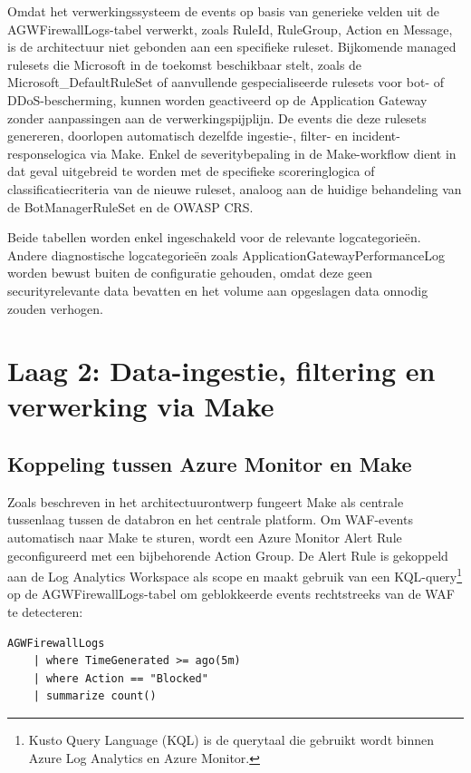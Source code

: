 Omdat het verwerkingssysteem de events op basis van generieke velden uit de AGWFirewallLogs-tabel verwerkt, zoals RuleId, RuleGroup, Action en Message, is de architectuur niet gebonden aan een specifieke ruleset. Bijkomende managed rulesets die Microsoft in de toekomst beschikbaar stelt, zoals de Microsoft\_DefaultRuleSet of aanvullende gespecialiseerde rulesets voor bot- of DDoS-bescherming, kunnen worden geactiveerd op de Application Gateway zonder aanpassingen aan de verwerkingspijplijn. De events die deze rulesets genereren, doorlopen automatisch dezelfde ingestie-, filter- en incident-responselogica via Make. Enkel de severitybepaling in de Make-workflow dient in dat geval uitgebreid te worden met de specifieke scoreringlogica of classificatiecriteria van de nieuwe ruleset, analoog aan de huidige behandeling van de BotManagerRuleSet en de OWASP CRS.

Beide tabellen worden enkel ingeschakeld voor de relevante logcategorieën. Andere diagnostische logcategorieën zoals ApplicationGatewayPerformanceLog worden bewust buiten de configuratie gehouden, omdat deze geen securityrelevante data bevatten en het volume aan opgeslagen data onnodig zouden verhogen.


\section{Laag 2: Data-ingestie, filtering en verwerking via Make}
\subsection{Koppeling tussen Azure Monitor en Make}

Zoals beschreven in het architectuurontwerp fungeert Make als centrale tussenlaag tussen de databron en het centrale platform. Om WAF-events automatisch naar Make te sturen, wordt een Azure Monitor Alert Rule geconfigureerd met een bijbehorende Action Group. De Alert Rule is gekoppeld aan de Log Analytics Workspace als scope en maakt gebruik van een KQL-query\footnote{Kusto Query Language (KQL) is de querytaal die gebruikt wordt binnen Azure Log Analytics en Azure Monitor.} op de AGWFirewallLogs-tabel om geblokkeerde events rechtstreeks van de WAF te detecteren:

\begin{lstlisting}[style=kqlstyle, caption={KQL-query voor de Azure Monitor Alert Rule op geblokkeerde WAF-events}]
    AGWFirewallLogs
    | where TimeGenerated >= ago(5m)
    | where Action == "Blocked"
    | summarize count()
\end{lstlisting}

